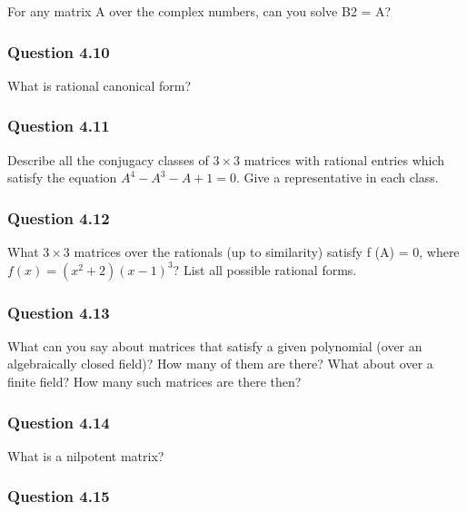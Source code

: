 For any matrix A over the complex numbers, can you solve B2 = A?

\hypertarget{question-4.10}{%
\subsubsection{Question 4.10}\label{question-4.10}}

What is rational canonical form?

\hypertarget{question-4.11}{%
\subsubsection{Question 4.11}\label{question-4.11}}

Describe all the conjugacy classes of \(3 \times 3\) matrices with
rational entries which satisfy the equation \(A^4 - A^3 - A + 1 = 0\).
Give a representative in each class.

\hypertarget{question-4.12}{%
\subsubsection{Question 4.12}\label{question-4.12}}

What \(3 \times 3\) matrices over the rationals (up to similarity)
satisfy f (A) = 0, where\(f (x) = (x^2 + 2)(x - 1)^3\)? List all
possible rational forms. 

\hypertarget{question-4.13}{%
\subsubsection{Question 4.13}\label{question-4.13}}

What can you say about matrices that satisfy a given polynomial (over an
algebraically closed field)? How many of them are there? What about over
a finite field? How many such matrices are there then?

\hypertarget{question-4.14}{%
\subsubsection{Question 4.14}\label{question-4.14}}

What is a nilpotent matrix?

\hypertarget{question-4.15}{%
\subsubsection{Question 4.15}\label{question-4.15}}

